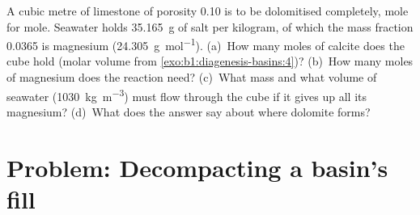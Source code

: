 \begin{exercise}[$\star\star\star$]\label{exo:b1:diagenesis-basins:12}
A cubic metre of limestone of porosity \num{0.10} is to be dolomitised
completely, mole for mole. Seawater holds \qty{35.165}{g} of salt per kilogram,
of which the mass fraction \num{0.0365} is magnesium (\qty{24.305}{g.mol^{-1}}).
(a)~How many moles of calcite does the cube hold (molar volume from
\cref{exo:b1:diagenesis-basins:4})? (b)~How many moles of magnesium does the
reaction need? (c)~What mass and what volume of seawater
(\qty{1030}{kg.m^{-3}}) must flow through the cube if it gives up all its
magnesium? (d)~What does the answer say about where dolomite forms?
\end{exercise}

\section{Problem: Decompacting a basin's fill}

